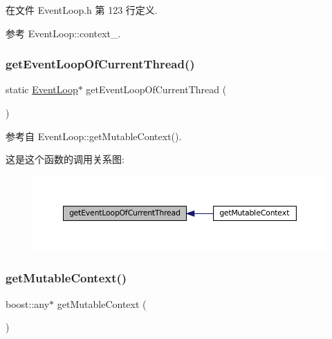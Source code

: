 在文件 Event\+Loop.\+h 第 123 行定义.



参考 Event\+Loop\+::context\+\_\+.

\mbox{\label{classmuduo_1_1net_1_1EventLoop_a25f818975e3bdac238daa2b99bc0477b}} 
\subsubsection{\texorpdfstring{get\+Event\+Loop\+Of\+Current\+Thread()}{getEventLoopOfCurrentThread()}}
{\footnotesize\ttfamily static \hyperlink{classmuduo_1_1net_1_1EventLoop}{Event\+Loop}$\ast$ get\+Event\+Loop\+Of\+Current\+Thread (\begin{DoxyParamCaption}{ }\end{DoxyParamCaption})\hspace{0.3cm}{\ttfamily [static]}}



参考自 Event\+Loop\+::get\+Mutable\+Context().

这是这个函数的调用关系图\+:
\nopagebreak
\begin{figure}[H]
\begin{center}
\leavevmode
\includegraphics[width=350pt]{classmuduo_1_1net_1_1EventLoop_a25f818975e3bdac238daa2b99bc0477b_icgraph}
\end{center}
\end{figure}
\mbox{\label{classmuduo_1_1net_1_1EventLoop_aca752855bdbb8cc6b18d05be1286b8f1}} 
\subsubsection{\texorpdfstring{get\+Mutable\+Context()}{getMutableContext()}}
{\footnotesize\ttfamily boost\+::any$\ast$ get\+Mutable\+Context (\begin{DoxyParamCaption}{ }\end{DoxyParamCaption})\hspace{0.3cm}{\ttfamily [inline]}}



